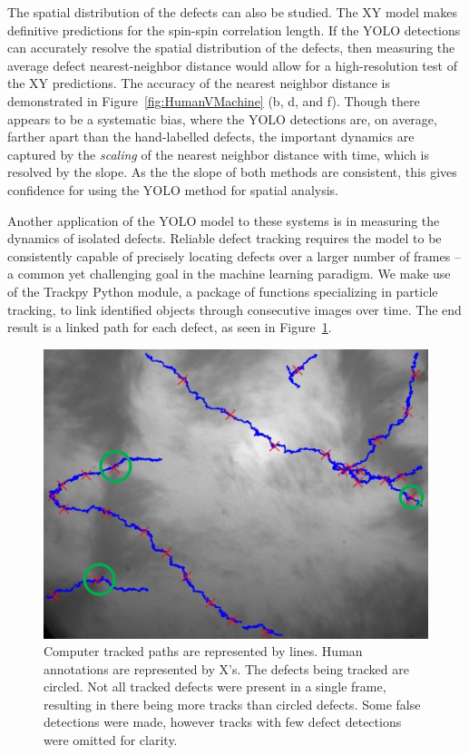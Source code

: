 \documentclass[twoside,twocolumn,9pt]{article}
\begin{document}
The spatial distribution of the defects can also be studied. The XY model makes definitive predictions for the spin-spin correlation length\cite{yurke_coarsening_1993}. If the YOLO detections can accurately resolve the spatial distribution of the defects, then measuring the average defect nearest-neighbor distance would allow for a high-resolution test of the XY predictions. The accuracy of the nearest neighbor distance is demonstrated in  Figure~\ref{fig:HumanVMachine} (b, d, and f). Though there appears to be a systematic bias, where the YOLO detections are, on average, farther apart than the hand-labelled defects, the important dynamics are captured by the \textit{scaling} of the nearest neighbor distance with time, which is resolved by the slope. As the the slope of both methods are consistent, this gives confidence for using the YOLO method for spatial analysis.


Another application of the YOLO model to these systems is in measuring the dynamics of isolated defects.
Reliable defect tracking requires the model to be consistently capable of precisely locating defects over a larger number of frames -- a common yet challenging goal in the machine learning paradigm. We make use of the Trackpy Python module, a package of functions specializing in particle tracking, to link identified objects through consecutive images over time. The end result is a linked path for each defect, as seen in Figure~\ref{fig:tracks}.

\begin{figure}
  \includegraphics[width=\linewidth]{circleTrack.jpg}
  \caption{Computer tracked paths are represented by lines. Human annotations are represented by X's. The defects being tracked are circled. Not all tracked defects were present in a single frame, resulting in there being more tracks than circled defects. Some false detections were made, however tracks with few defect detections were omitted for clarity. }
  \label{fig:tracks} 
\end{figure}
\end{document}
